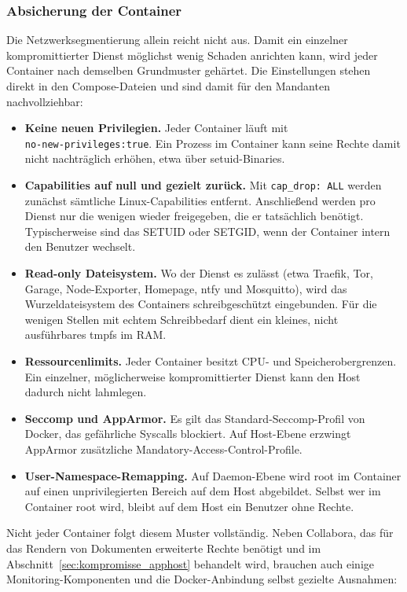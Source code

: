\subsubsection{Absicherung der Container}
\label{sec:apphost-container}

Die Netzwerksegmentierung allein reicht nicht aus. Damit ein einzelner
kompromittierter Dienst möglichst wenig Schaden anrichten kann, wird jeder
Container nach demselben Grundmuster gehärtet. Die Einstellungen stehen
direkt in den Compose-Dateien und sind damit für den Mandanten
nachvollziehbar:

\begin{itemize}
  \item \textbf{Keine neuen Privilegien.} Jeder Container läuft mit\\
    \texttt{no-new-privileges:true}. Ein Prozess im Container kann seine
    Rechte damit nicht nachträglich erhöhen, etwa über setuid-Binaries.
  \item \textbf{Capabilities auf null und gezielt zurück.} Mit
    \texttt{cap\_drop: ALL} werden zunächst sämtliche Linux-Capabilities
    entfernt. Anschließend werden pro Dienst nur die wenigen wieder
    freigegeben, die er tatsächlich benötigt. Typischerweise sind das SETUID
    oder SETGID, wenn der Container intern den Benutzer wechselt.
  \item \textbf{Read-only Dateisystem.} Wo der Dienst es zulässt (etwa
    Traefik, Tor, Garage, Node-Exporter, Homepage, ntfy und Mosquitto), wird
    das Wurzeldateisystem des Containers schreibgeschützt eingebunden. Für
    die wenigen Stellen mit echtem Schreibbedarf dient ein kleines, nicht
    ausführbares tmpfs im \ac{RAM}.
  \item \textbf{Ressourcenlimits.} Jeder Container besitzt \ac{CPU}- und
    Speicherobergrenzen. Ein einzelner, möglicherweise kompromittierter
    Dienst kann den Host dadurch nicht lahmlegen.
  \item \textbf{Seccomp und AppArmor.} Es gilt das Standard-Seccomp-Profil
    von Docker, das gefährliche Syscalls blockiert. Auf Host-Ebene erzwingt
    AppArmor zusätzliche Mandatory-Access-Control-Profile.
  \item \textbf{User-Namespace-Remapping.} Auf Daemon-Ebene wird root im
    Container auf einen unprivilegierten Bereich auf dem Host abgebildet.
    Selbst wer im Container root wird, bleibt auf dem Host ein Benutzer ohne
    Rechte.
\end{itemize}

Nicht jeder Container folgt diesem Muster vollständig. Neben Collabora, das für
das Rendern von Dokumenten erweiterte Rechte benötigt und im Abschnitt~\ref{sec:kompromisse_apphost} 
behandelt wird, brauchen auch einige Monitoring-Komponenten und
die Docker-Anbindung selbst gezielte Ausnahmen:

